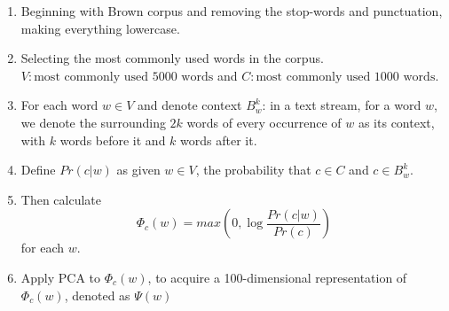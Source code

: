 \documentclass[12pt]{article}
\begin{document}
\begin{enumerate}[label=(\alph*)]
\item Beginning with Brown corpus and removing the stop-words and punctuation, making everything lowercase.
\item Selecting the most commonly used words in the corpus. $V: \text{most commonly used 5000 words}$ and $C: \text{most commonly used 1000 words}$.
\item For each word $w \in V$ and denote context $B_w^k$: in a text stream, for a word $w$, we denote the surrounding $2k$ words of every occurrence of $w$ as its context, with $k$ words before it and $k$ words after it. 
\item Define $Pr(c|w)$ as given $w \in V$, the probability that $c \in C$ and $c \in B_w^k$.
\item Then calculate $$\Phi_c(w)= max(0,\log \frac{Pr(c|w)}{Pr(c)})$$
for each $w$.
\item Apply PCA to $\Phi_c(w)$, to acquire a 100-dimensional representation of $\Phi_c(w)$, denoted as $\Psi(w)$
\end{enumerate}
\end{document}
